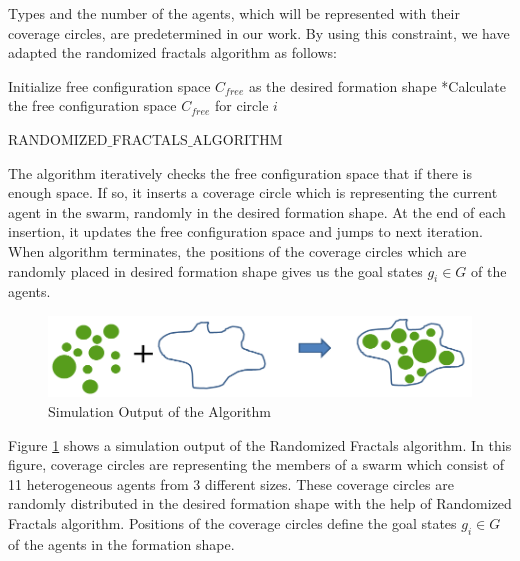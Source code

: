 Types and the number of the agents, which will be represented with their coverage circles, are predetermined in our work. By using this constraint, we have adapted the randomized fractals algorithm as follows:
		
\begin{algorithm}[H]
Initialize free configuration space $C_{free}$ as the desired formation shape \newline
{}
{		
*Calculate the free configuration space $C_{free}$ for circle $i$\;
}\												
\caption{RANDOMIZED$\_$FRACTALS$\_$ALGORITHM} 
\end{algorithm}
		
The algorithm iteratively checks the free configuration space that if there is enough space. If so, it inserts a coverage circle which is representing the current agent in the swarm, randomly in the desired formation shape. At the end of each insertion, it updates the free configuration space and jumps to next iteration. When algorithm terminates, the positions of the coverage circles which are randomly placed in desired formation shape gives us the goal states $g_i \in G$  of the agents. 

\begin{figure}[H]
\caption{Simulation Output of the Algorithm} \label{randomized_ornek}
\centering
\includegraphics[scale = 0.60]{randomized_ornek}
\end{figure}

Figure \ref{randomized_ornek} shows a simulation output of the Randomized Fractals algorithm. In this figure, coverage circles are representing the members of a swarm which consist of 11 heterogeneous agents from 3 different sizes. These coverage circles are randomly distributed in the desired formation shape with the help of Randomized Fractals algorithm. Positions of the coverage circles define the goal states $g_i \in G$  of the agents in the formation shape. 

